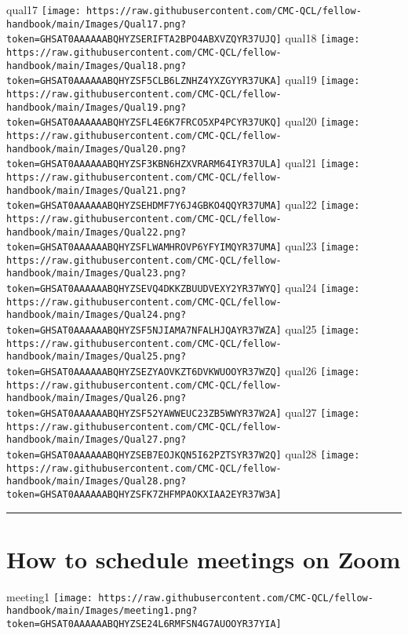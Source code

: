 \documentclass[
]{book}
\begin{document}
qual17
\texttt{[image: https://raw.githubusercontent.com/CMC-QCL/fellow-handbook/main/Images/Qual17.png?token=GHSAT0AAAAAABQHYZSERIFTA2BPO4ABXVZQYR37UJQ]}
qual18
\texttt{[image: https://raw.githubusercontent.com/CMC-QCL/fellow-handbook/main/Images/Qual18.png?token=GHSAT0AAAAAABQHYZSF5CLB6LZNHZ4YXZGYYR37UKA]}
qual19
\texttt{[image: https://raw.githubusercontent.com/CMC-QCL/fellow-handbook/main/Images/Qual19.png?token=GHSAT0AAAAAABQHYZSFL4E6K7FRCO5XP4PCYR37UKQ]}
qual20
\texttt{[image: https://raw.githubusercontent.com/CMC-QCL/fellow-handbook/main/Images/Qual20.png?token=GHSAT0AAAAAABQHYZSF3KBN6HZXVRARM64IYR37ULA]}
qual21
\texttt{[image: https://raw.githubusercontent.com/CMC-QCL/fellow-handbook/main/Images/Qual21.png?token=GHSAT0AAAAAABQHYZSEHDMF7Y6J4GBKO4QQYR37UMA]}
qual22
\texttt{[image: https://raw.githubusercontent.com/CMC-QCL/fellow-handbook/main/Images/Qual22.png?token=GHSAT0AAAAAABQHYZSFLWAMHROVP6YFYIMQYR37UMA]}
qual23
\texttt{[image: https://raw.githubusercontent.com/CMC-QCL/fellow-handbook/main/Images/Qual23.png?token=GHSAT0AAAAAABQHYZSEVQ4DKKZBUUDVEXY2YR37WYQ]}
qual24
\texttt{[image: https://raw.githubusercontent.com/CMC-QCL/fellow-handbook/main/Images/Qual24.png?token=GHSAT0AAAAAABQHYZSF5NJIAMA7NFALHJQAYR37WZA]}
qual25
\texttt{[image: https://raw.githubusercontent.com/CMC-QCL/fellow-handbook/main/Images/Qual25.png?token=GHSAT0AAAAAABQHYZSEZYAOVKZT6DVKWUOOYR37WZQ]}
qual26
\texttt{[image: https://raw.githubusercontent.com/CMC-QCL/fellow-handbook/main/Images/Qual26.png?token=GHSAT0AAAAAABQHYZSF52YAWWEUC23ZB5WWYR37W2A]}
qual27
\texttt{[image: https://raw.githubusercontent.com/CMC-QCL/fellow-handbook/main/Images/Qual27.png?token=GHSAT0AAAAAABQHYZSEB7EOJKQN5I62PZTSYR37W2Q]}
qual28
\texttt{[image: https://raw.githubusercontent.com/CMC-QCL/fellow-handbook/main/Images/Qual28.png?token=GHSAT0AAAAAABQHYZSFK7ZHFMPAOKXIAA2EYR37W3A]}

\begin{center}\rule{0.5\linewidth}{0.5pt}\end{center}

\hypertarget{how-to-schedule-meetings-on-zoom}{%
\section{How to schedule meetings on Zoom}\label{how-to-schedule-meetings-on-zoom}}

meeting1
\texttt{[image: https://raw.githubusercontent.com/CMC-QCL/fellow-handbook/main/Images/meeting1.png?token=GHSAT0AAAAAABQHYZSE24L6RMFSN4G7AUOOYR37YIA]}
\end{document}
